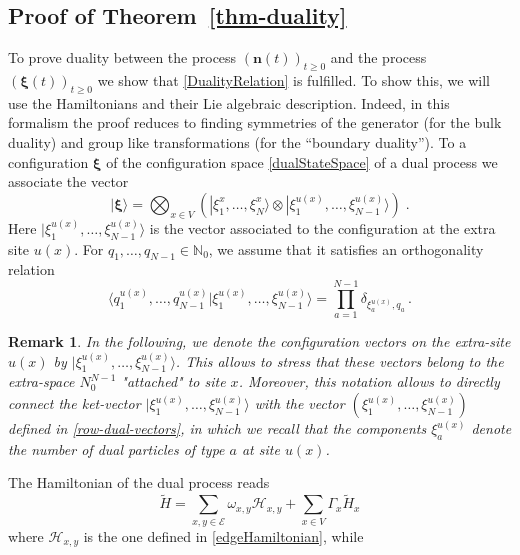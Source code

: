 \documentclass[10pt]{article}
\numberwithin{equation}{section}
\numberwithin{equation}{subsection}
\newtheorem{remark}{Remark}
\newcommand{\dt}{\;.}
\begin{document}
\subsection{Proof of Theorem~\ref{thm-duality}}
\label{proof-th-duality}
To prove duality between the process $(\bm{n}(t))_{t\geq 0}$ and the process  $(\bm{\xi}(t))_{t\geq 0}$ we  show that \eqref{DualityRelation} is fulfilled.  To show this, we will use the Hamiltonians and their Lie algebraic description. Indeed, in this formalism the proof
reduces to finding symmetries of the generator (for the bulk duality) and group like transformations (for the ``boundary duality'').
To a configuration $\bm{\xi}$ of the configuration space  \eqref{dualStateSpace} of a dual process we associate the vector
\begin{equation}
    |\bm{\xi}\rangle=\bigotimes_{x\in V}\left(|\xi_{1}^{x},\ldots,\xi_{N}^{x}\rangle\otimes |\xi_{1}^{u(x)},\ldots,\xi_{N-1}^{u(x)}\rangle\right)\dt
\end{equation}
{Here $|\xi_{1}^{u(x)},\ldots,\xi_{N-1}^{u(x)}\rangle$ is the vector associated to the configuration at the extra site $u(x)$.  For $q_{1},\ldots,q_{N-1}\in \mathbb{N}_{0}$, we assume that it satisfies an orthogonality relation
\begin{equation}\label{ortho-extraSite}
	\langle q_{1}^{u(x)},\ldots,q^{u(x)}_{N-1}|\xi_{1}^{u(x)},\ldots,\xi_{N-1}^{u(x)}\rangle=\prod_{a=1}^{N-1}\delta_{\xi_{a}^{u(x)},q_{a}}\,.
\end{equation} }
{\begin{remark}\label{reamrk-extraSite}
	In the following, we denote the configuration vectors on the extra-site $u(x)$ by $|\xi_{1}^{u(x)},\ldots,\xi_{N-1}^{u(x)}\rangle$. This allows to stress that these vectors belong to the extra-space $N_{0}^{N-1}$ "attached" to site $x$. Moreover, this notation allows to directly connect the ket-vector $|\xi_{1}^{u(x)},\ldots,\xi_{N-1}^{u(x)}\rangle$ with the vector $(\xi_{1}^{u(x)},\ldots,\xi_{N-1}^{u(x)})$ defined in \eqref{row-dual-vectors}, in which we recall that the components $\xi_{a}^{u(x)}$ denote the number of dual particles of type $a$ at site $u(x)$.
\end{remark}} 
The Hamiltonian of the dual process reads
\begin{equation}\label{DualHamiltonian}
    \widetilde{H}=\sum_{x,y\in \mathcal{E}}\omega_{x,y}\mathcal{H}_{x,y}+\sum_{x\in V}\Gamma_{x}\widetilde{H}_{x}
\end{equation}
where $\mathcal{H}_{x,y}$ is the one defined in \eqref{edgeHamiltonian}, while 
\end{document}
